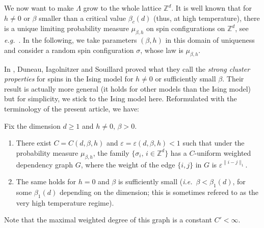 \documentclass[envcountsame]{svmult}
\def\WDep{G}
\newcommand{\Z}{\mathbb{Z}}
\newcommand{\eps}{\varepsilon}
\begin{document}
We now want to make $\Lambda$ grow to the whole lattice $\Z^d$.
It is well known that for $h \ne 0$ or $\beta$ smaller than a critical value $\beta_c(d)$ (thus, at high temperature),
there is a unique limiting probability measure $\mu_{\beta,h}$ on spin configurations on $\Z^d$, see {\em e.g.}~\cite[Theorem 3.41]{Velenik}.
In the following, we take parameters $(\beta,h)$ in this domain of uniqueness 
and consider a random spin configuration $\sigma$, whose law is $\mu_{\beta,h}$.
\bigskip



In \cite{Duneau2}, Duneau, Iagolnitzer and Souillard proved what they call the {\em strong cluster properties}
for spins in the Ising model for $h \ne 0$ or sufficiently small $\beta$. Their result is actually more general (it holds for other models than the Ising model) but for simplicity, we stick to the Ising model here.
Reformulated with the terminology of the present article, we have:
\begin{theorem}
  Fix the dimension $d\geq 1$ and $h \ne 0,\,\beta>0$.
  \begin{enumerate}
  	\item There exist $C=C(d,\beta,h)$ and $\eps=\eps(d,\beta,h)<1$
      such that under the probability measure $\mu_{\beta,h}$, 
  the family $\{\sigma_i,\, i \in \Z^d\}$ has a $C$-uniform weighted dependency graph $\WDep$,
  where the weight of the edge $\{i,j\}$ in $\WDep$ is $\eps^{\|i-j\|_1}$.
  \item The same holds for $h=0$ and $\beta$ is sufficiently small (\emph{i.e.}~$\beta<\beta_1(d)$,
    for some $\beta_1(d)$ depending on the dimension; 
    this is sometimes refered to as the very high temperature regime).
  \end{enumerate}
  \label{thm:Cumu_Ising}
\end{theorem}
Note that the maximal weighted degree of this graph is a constant $C' < \infty$.
\bigskip
\end{document}
